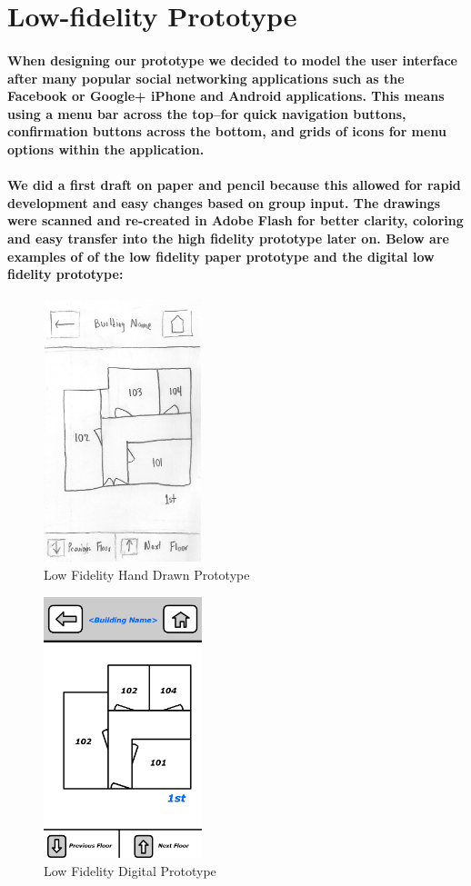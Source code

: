 \documentclass{report}
\begin{document}
\section{Low-fidelity Prototype}
    \paragraph{When designing our prototype we decided to model the user
    interface after many popular social networking applications such as the Facebook
    or Google+ iPhone and Android applications. This means using a menu bar across
    the top--for quick navigation buttons, confirmation buttons across the bottom,
    and grids of icons for menu options within the application.}
    \paragraph{We did a first draft on paper and pencil because this allowed for
    rapid development and easy changes based on group input. The drawings were
    scanned and re-created in Adobe Flash for better clarity, coloring and easy
    transfer into the high fidelity prototype later on. Below are examples of of the
    low fidelity paper prototype and the digital low fidelity prototype:}
    \begin{figure}
        \centering
            \includegraphics[height=3in]{img/figure431.png}
        \caption{Low Fidelity Hand Drawn Prototype}
        \label{fig:lfpaper}
    \end{figure}
    \begin{figure}
        \centering
            \includegraphics[height=3in]{img/figure432.png}
        \caption{Low Fidelity Digital Prototype}
        \label{fig:lfdigital}
    \end{figure}
\end{document}
